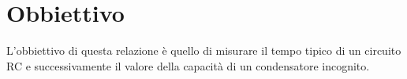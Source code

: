 \section*{Obbiettivo}

L'obbiettivo di questa relazione è quello di misurare il tempo tipico di un circuito RC e  successivamente il valore della capacità di un condensatore incognito.

